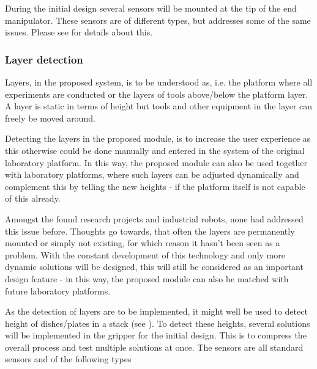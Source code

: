 \documentclass{sigchi}
\begin{document}
	During the initial design several sensors will be mounted at the tip of the end manipulator. These sensors are of different types, but addresses some of the same issues. Please see  for details about this.


	\subsubsection{Layer detection}\label{subsub:Initial_LayerDetection}
	Layers, in the proposed system, is to be understood as, i.e. the platform where all experiments are conducted or the layers of tools above/below the platform layer. A layer is static in terms of height but tools and other equipment in the layer can freely be moved around.
	
	Detecting the layers in the proposed module, is to increase the user experience as this otherwise could be done manually and entered in the system of the original laboratory platform. In this way, the proposed module can also be used together with laboratory platforms, where such layers can be adjusted dynamically and complement this by telling the new heights - if the platform itself is not capable of this already.
	
	Amongst the found research projects and industrial robots, none had addressed this issue before. Thoughts go towards, that often the layers are permanently mounted or simply not existing, for which reason it hasn't been seen as a problem. With the constant development of this technology and only more dynamic solutions will be designed, this will still be considered as an important design feature - in this way, the proposed module can also be matched with future laboratory platforms.
	
	As the detection of layers are to be implemented, it might well be used to detect height of dishes/plates in a stack (see ). To detect these heights, several solutions will be implemented in the gripper for the initial design. This is to compress the overall process and test multiple solutions at once. The sensors are all standard sensors and of the following types
	
\end{document}
